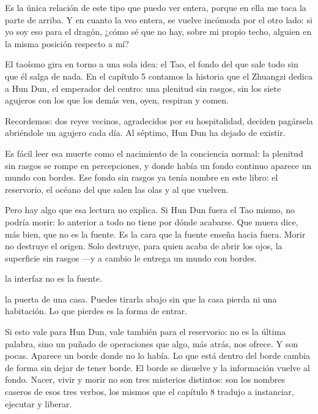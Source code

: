 Es la única relación de este tipo que puedo ver entera, porque en ella me toca la parte de arriba. Y en cuanto la veo entera, se vuelve incómoda por el otro lado: si yo soy eso para el dragón, ¿cómo sé que no hay, sobre mi propio techo, alguien en la misma posición respecto a mí?

\noindent El taoísmo gira en torno a una sola idea: el Tao, el fondo del que sale todo sin que él salga de nada. En el capítulo 5 contamos la historia que el Zhuangzi dedica a Hun Dun, el emperador del centro: una plenitud sin rasgos, sin los siete agujeros con los que los demás ven, oyen, respiran y comen.

Recordemos: dos reyes vecinos, agradecidos por su hospitalidad, deciden pagársela abriéndole un agujero cada día. Al séptimo, Hun Dun ha dejado de existir.

Es fácil leer esa muerte como el nacimiento de la conciencia normal: la plenitud sin rasgos se rompe en percepciones, y donde había un fondo continuo aparece un mundo con bordes. Ese fondo sin rasgos ya tenía nombre en este libro: el reservorio, el océano del que salen las olas y al que vuelven.

Pero hay algo que esa lectura no explica. Si Hun Dun fuera el Tao mismo, no podría morir: lo anterior a todo no tiene por dónde acabarse. Que muera dice, más bien, que no es la fuente. Es la cara que la fuente enseña hacia fuera. Morir no destruye el origen. Solo destruye, para quien acaba de abrir los ojos, la superficie sin rasgos —y a cambio le entrega un mundo con bordes.

\begin{fisica}
 la interfaz no es la fuente.

 la puerta de una casa. Puedes tirarla abajo sin que la casa pierda ni una habitación. Lo que pierdes es la forma de entrar.
\end{fisica}
\noindent Si esto vale para Hun Dun, vale también para el reservorio: no es la última palabra, sino un puñado de operaciones que algo, más atrás, nos ofrece. Y son pocas. Aparece un borde donde no lo había. Lo que está dentro del borde cambia de forma sin dejar de tener borde. El borde se disuelve y la información vuelve al fondo. Nacer, vivir y morir no son tres misterios distintos: son los nombres caseros de esos tres verbos, los mismos que el capítulo 8 tradujo a instanciar, ejecutar y liberar.

